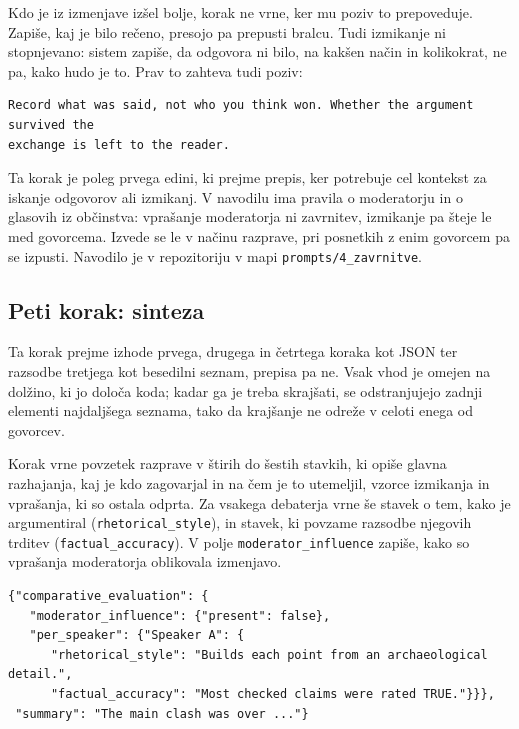 \documentclass[a4paper, 12pt]{book}
\begin{document}
Kdo je iz izmenjave izšel bolje, korak ne vrne, ker mu poziv to prepoveduje. Zapiše, kaj je bilo rečeno,
presojo pa prepusti bralcu. Tudi izmikanje ni stopnjevano: sistem zapiše, da
odgovora ni bilo, na kakšen način in kolikokrat, ne pa, kako hudo je to. Prav to zahteva tudi poziv:

\begin{lstlisting}[basicstyle=\ttfamily\scriptsize,breaklines=true]
Record what was said, not who you think won. Whether the argument survived the
exchange is left to the reader.
\end{lstlisting}

Ta korak je poleg prvega edini, ki prejme prepis, ker potrebuje cel kontekst za iskanje odgovorov ali izmikanj. V navodilu ima pravila o moderatorju in o glasovih iz občinstva: vprašanje moderatorja ni zavrnitev, izmikanje pa šteje le med govorcema. Izvede se le v načinu razprave, pri posnetkih z enim govorcem pa se izpusti. Navodilo je v repozitoriju v mapi \texttt{prompts/4\_zavrnitve}.

\subsection{Peti korak: sinteza}
\label{ssec:prehod5}

Ta korak prejme izhode prvega, drugega in četrtega koraka kot JSON ter razsodbe tretjega kot besedilni seznam, prepisa pa ne. Vsak vhod je omejen na dolžino, ki jo določa koda; kadar ga je
treba skrajšati, se odstranjujejo zadnji elementi najdaljšega seznama, tako da
krajšanje ne odreže v celoti enega od govorcev.

Korak vrne povzetek razprave v štirih do šestih stavkih, ki opiše glavna
razhajanja, kaj je kdo zagovarjal in na čem je to utemeljil, vzorce izmikanja in
vprašanja, ki so ostala odprta. Za vsakega debaterja vrne še stavek o tem, kako je argumentiral (\texttt{rhetorical\_style}), in stavek, ki povzame razsodbe njegovih trditev (\texttt{factual\_accuracy}). V polje \texttt{moderator\_influence} zapiše, kako so vprašanja moderatorja oblikovala izmenjavo.

\begin{lstlisting}[basicstyle=\ttfamily\scriptsize,breaklines=true]
{"comparative_evaluation": {
   "moderator_influence": {"present": false},
   "per_speaker": {"Speaker A": {
      "rhetorical_style": "Builds each point from an archaeological detail.",
      "factual_accuracy": "Most checked claims were rated TRUE."}}},
 "summary": "The main clash was over ..."}
\end{lstlisting}
\end{document}
